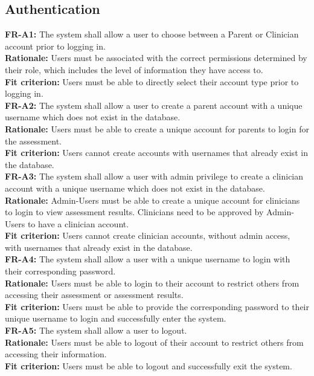 \documentclass[12pt]{article}
\begin{document}
\subsection{Authentication}
\textbf{FR-A1: }The system shall allow a user to choose between a Parent or Clinician account prior to logging in.\\
\textbf{Rationale: }Users must be associated with the correct permissions determined by their role, which includes the level of information they have access to.\\
\textbf{Fit criterion: }Users must be able to directly select their account type prior to logging in.\\

\textbf{FR-A2: }The system shall allow a user to create a parent account with a unique username which does not exist in the database.\\
\textbf{Rationale: }Users must be able to create a unique account for parents to login for the assessment.\\
\textbf{Fit criterion: }Users cannot create accounts with usernames that already exist in the database.\\

\textbf{FR-A3: }The system shall allow a user with admin privilege to create a clinician account with a unique username which does not exist in the database.\\
\textbf{Rationale: }Admin-Users must be able to create a unique account for clinicians to login to view assessment results. Clinicians need to be approved by Admin-Users to have a clinician account.\\
\textbf{Fit criterion: }Users cannot create clinician accounts, without admin access, with usernames that already exist in the database.\\

\textbf{FR-A4: }The system shall allow a user with a unique username to login with their corresponding password.\\
\textbf{Rationale: }Users must be able to login to their account to restrict others from accessing their assessment or assessment results.\\
\textbf{Fit criterion: }Users must be able to provide the corresponding password to their unique username to login and successfully enter the system.\\

\textbf{FR-A5: }The system shall allow a user to logout.\\
\textbf{Rationale: }Users must be able to logout of their account to restrict others from accessing their information.\\
\textbf{Fit criterion: }Users must be able to logout and successfully exit the system.\\
\end{document}
